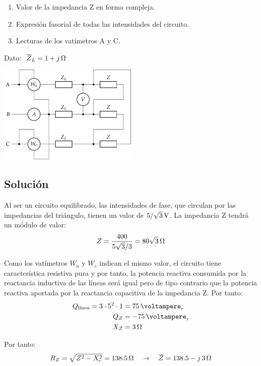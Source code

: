 \begin{enumerate}
\item Valor de la impedancia Z en forma compleja.
\item Expresión fasorial de todas las intensidades del circuito.
\item Lecturas de los vatímetros A y C.
\end{enumerate}

Dato: $\; \overline{Z}_L = \SI[parse-numbers = false]{1 + j}{\ohm}$

\begin{center}
  \includegraphics[width = 0.5\textwidth]{figuras/BT3_12}
\end{center}


\subsection*{Solución}

Al ser un circuito equilibrado, las intensidades de fase, que
circulan por las impedancias del triángulo, tienen un valor de
$\SI[parse-numbers=false]{5/\sqrt{3}}{\volt}$. La impedancia Z
tendrá un módulo de valor:
\[
  Z = \frac{400}{5\sqrt{3}/3} =
  \SI[parse-numbers=false]{80\sqrt{3}}{\ohm}
\]

Como los vatímetros $W_a$ y $W_c$ indican el mismo valor, el
circuito tiene característica resistiva pura y por tanto, la
potencia reactiva consumida por la reactancia inductiva de las
líneas será igual pero de tipo contrario que la potencia reactiva
aportada por la reactancia capacitiva de la impedancia Z. Por tanto:
\begin{align*}
  Q_{\textrm{línea}} = 3 \cdot 5^2 \cdot 1 &= \SI{75}{\voltampere}_r\\
  Q_Z &= -\SI{75}{\voltampere}_r\\
  X_Z &= \SI{3}{\ohm}
\end{align*}

Por tanto:
\[
  R_Z = \sqrt{Z^2 - X_c^2} = \SI{138.5}{\ohm} \quad\rightarrow\quad \overline{Z} = \SI[parse-numbers=false]{138.5 - j\,3}{\ohm}
\]

